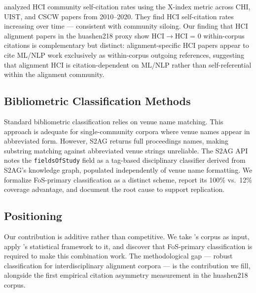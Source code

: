 \citet{Chen2023HCI} analyzed HCI community self-citation rates using the X-index metric across CHI, UIST, and CSCW papers from 2010--2020.
They find HCI self-citation rates increasing over time --- consistent with community siloing.
Our finding that HCI alignment papers in the huashen218 proxy show HCI$\to$HCI = 0 within-corpus citations is complementary but distinct: alignment-specific HCI papers appear to cite ML/NLP work exclusively as within-corpus outgoing references, suggesting that alignment HCI is citation-dependent on ML/NLP rather than self-referential within the alignment community.

\subsection{Bibliometric Classification Methods}

Standard bibliometric classification relies on venue name matching.
This approach is adequate for single-community corpora where venue names appear in abbreviated form.
However, S2AG returns full proceedings names, making substring matching against abbreviated venue strings unreliable.
The S2AG API \citep{Wade2022S2AG} notes the \texttt{fieldsOfStudy} field as a tag-based disciplinary classifier derived from S2AG's knowledge graph, populated independently of venue name formatting.
We formalize FoS-primary classification as a distinct scheme, report its 100\% vs.\ 12\% coverage advantage, and document the root cause to support replication.

\subsection{Positioning}

Our contribution is additive rather than competitive.
We take \citet{Shen2024Position}'s corpus as input, apply \citet{Wahle2023WhoWeCite}'s statistical framework to it, and discover that FoS-primary classification is required to make this combination work.
The methodological gap --- robust classification for interdisciplinary alignment corpora --- is the contribution we fill, alongside the first empirical citation asymmetry measurement in the huashen218 corpus.
